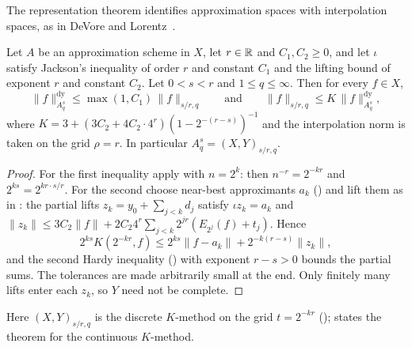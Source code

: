 The representation theorem identifies approximation spaces with interpolation spaces, as in
DeVore and Lorentz~\cite[Chapter~7]{DeVoreLorentz}.

\begin{theorem}
\label{thm:representation}
\leanok
{}
Let $A$ be an approximation scheme in $X$, let $r \in \mathbb{R}$ and $C_1, C_2 \geq 0$, and let
$\iota$ satisfy Jackson's inequality of order $r$ and constant $C_1$ and the lifting bound of
exponent $r$ and constant $C_2$. Let $0 < s < r$ and $1 \leq q \leq \infty$. Then for every
$f \in X$,
\[
  \|f\|^{\mathrm{dy}}_{A^s_q} \leq \max(1, C_1) \, \|f\|_{s/r, q}
  \qquad \text{and} \qquad
  \|f\|_{s/r, q} \leq K \, \|f\|^{\mathrm{dy}}_{A^s_q},
\]
where $K = 3 + (3C_2 + 4C_2 \cdot 4^r)(1 - 2^{-(r-s)})^{-1}$ and the interpolation norm is
taken on the grid $\rho = r$. In particular $A^s_q = (X, Y)_{s/r, q}$.
\end{theorem}

\begin{proof}
\leanok
For the first inequality apply  with $n = 2^k$: then
$n^{-r} = 2^{-kr}$ and $2^{ks} = 2^{kr \cdot s/r}$. For the second choose near-best
approximants $a_k$ () and lift them as in : the partial
lifts $z_k = y_0 + \sum_{j<k} d_j$ satisfy $\iota z_k = a_k$ and
$\|z_k\| \leq 3C_2 \|f\| + 2C_2 4^r \sum_{j<k} 2^{jr} (E_{2^j}(f) + t_j)$. Hence
\[
  2^{ks} K(2^{-kr}, f) \leq 2^{ks} \|f - a_k\| + 2^{-k(r-s)} \|z_k\| ,
\]
and the second Hardy inequality () with exponent $r - s > 0$ bounds the
partial sums. The tolerances are made arbitrarily small at the end. Only finitely many
lifts enter each $z_k$, so $Y$ need not be complete.
\end{proof}

Here $(X, Y)_{s/r, q}$ is the discrete $K$-method on the grid $t = 2^{-kr}$
();  states the theorem for
the continuous $K$-method.


